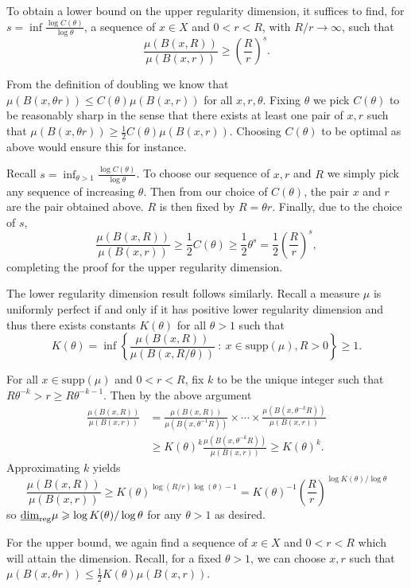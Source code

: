 To obtain a lower bound on the upper regularity dimension, it suffices to find, for $s = \inf\frac{\log C(\theta)}{\log \theta}$, a sequence of $x\in X$ and $0<r<R$, with $R/r \rightarrow \infty$, such that 
\[
\frac{\mu(B(x,R))}{\mu(B(x,r))} \ge \left(\frac{R}{r}\right)^s.
\]
	
	
From the definition of doubling we know that $\mu(B(x,\theta r) ) \le C(\theta) \mu(B(x,r))$ for all $x,r, \theta$. Fixing $\theta$ we pick $C(\theta)$ to be reasonably sharp in the sense that there exists at least one pair of $x,r$ such that $\mu(B(x,\theta r) ) \ge \frac{1}{2}C(\theta) \mu(B(x,r))$. Choosing $C(\theta)$ to be optimal as above would ensure this for instance.
	
Recall $s = \inf_{\theta > 1}\frac{\log C(\theta)}{\log \theta}$. To choose our sequence of $x,r$ and $R$ we simply pick any sequence of increasing $\theta$. Then from our choice of $C(\theta)$, the pair $x$ and $r$ are the pair obtained above. $R$ is then fixed by $R = \theta r$. Finally, due to the choice of $s$,
\[
\frac{\mu(B(x,R))}{\mu(B(x,r))} \ge \frac{1}{2} C(\theta)  \ge \frac{1}{2}\theta^s = \frac{1}{2}\left(\frac{R}{r} \right)^s,
\]
completing the proof for the upper regularity dimension.
	

The lower regularity dimension result follows similarly. Recall a measure $\mu$ is uniformly perfect if and only if it has positive lower regularity dimension and thus there exists constants $K(\theta)$ for all $\theta > 1$ such that 
\[
K(\theta) =  \inf \left\{ \frac{\mu(B(x,R))}{\mu(B(x,R/\theta))} \ : \ x \in \text{supp}(\mu), R>0 \right\} \geq 1.
\]

For all $x \in \text{supp}(\mu)$ and $0<r<R$, fix $k$ to be the unique integer such that $R \theta^{-k} > r \ge R \theta^{-k-1}$. Then by the above argument
\begin{align*}
\frac{\mu(B(x,R))}{\mu(B(x,r))} &= \frac{\mu(B(x,R))}{\mu(B(x,\theta^{-1}R))} \times \cdots \times \frac{\mu(B(x,\theta^{-k}R))}{\mu(B(x,r))} \\
&\ge K(\theta)^k \frac{\mu(B(x,\theta^{-k}R))}{\mu(B(x,r))} \ge K(\theta)^k.
\end{align*}
Approximating $k$ yields
\[
\frac{\mu(B(x,R))}{\mu(B(x,r))} \ge K(\theta)^{\log(R/r)\log(\theta) - 1} = K(\theta)^{-1} \left(\frac{R}{r}\right)^{\log K(\theta)/ \log \theta}
\]
so $\underline{\dim}_{\textup{reg}} \mu \geqslant \log K(\theta) / \log \theta$ for any $\theta > 1$ as desired. 

For the upper bound, we again find a sequence of $x\in X$ and $0<r<R$ which will attain the dimension. Recall, for a fixed $\theta > 1$, we can choose $x,r$ such that $\mu(B(x,\theta r)) \le \frac{1}{2}K(\theta)\mu(B(x,r))$. 

